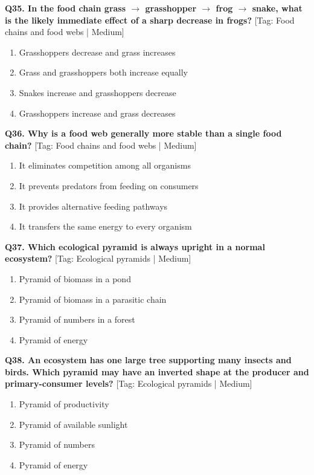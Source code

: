 \noindent\textbf{Q35. In the food chain grass $\to$ grasshopper $\to$ frog $\to$ snake, what is the likely immediate effect of a sharp decrease in frogs?} \hfill [Tag: Food chains and food webs | Medium]
\begin{enumerate}[label=(\alph*),topsep=2pt,itemsep=1pt,partopsep=0pt,parsep=0pt]
    \item {Grasshoppers decrease and grass increases}
    \item {Grass and grasshoppers both increase equally}
    \item {Snakes increase and grasshoppers decrease}
    \item {Grasshoppers increase and grass decreases}
\end{enumerate}
\vspace{2mm}

\noindent\textbf{Q36. Why is a food web generally more stable than a single food chain?} \hfill [Tag: Food chains and food webs | Medium]
\begin{enumerate}[label=(\alph*),topsep=2pt,itemsep=1pt,partopsep=0pt,parsep=0pt]
    \item {It eliminates competition among all organisms}
    \item {It prevents predators from feeding on consumers}
    \item {It provides alternative feeding pathways}
    \item {It transfers the same energy to every organism}
\end{enumerate}
\vspace{2mm}

\noindent\textbf{Q37. Which ecological pyramid is always upright in a normal ecosystem?} \hfill [Tag: Ecological pyramids | Medium]
\begin{enumerate}[label=(\alph*),topsep=2pt,itemsep=1pt,partopsep=0pt,parsep=0pt]
    \item {Pyramid of biomass in a pond}
    \item {Pyramid of biomass in a parasitic chain}
    \item {Pyramid of numbers in a forest}
    \item {Pyramid of energy}
\end{enumerate}
\vspace{2mm}

\noindent\textbf{Q38. An ecosystem has one large tree supporting many insects and birds. Which pyramid may have an inverted shape at the producer and primary-consumer levels?} \hfill [Tag: Ecological pyramids | Medium]
\begin{enumerate}[label=(\alph*),topsep=2pt,itemsep=1pt,partopsep=0pt,parsep=0pt]
    \item {Pyramid of productivity}
    \item {Pyramid of available sunlight}
    \item {Pyramid of numbers}
    \item {Pyramid of energy}
\end{enumerate}
\vspace{2mm}


